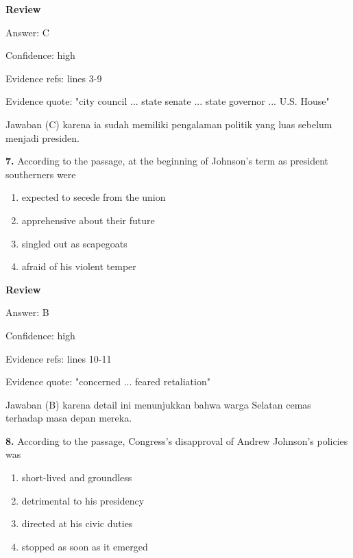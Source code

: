 \documentclass[12pt]{article}
\begin{document}
\par
\begingroup
\setlength{\parskip}{0pt}
\setlength{\parindent}{0pt}
\textbf{Review}\par
Answer: C\par
Confidence: high\par
Evidence refs: lines 3-9\par
Evidence quote: "city council ... state senate ... state governor ... U.S. House"\par
Jawaban (C) karena ia sudah memiliki pengalaman politik yang luas sebelum menjadi presiden.\par
\endgroup
\par
\vspace{0.25\baselineskip}
\noindent\textbf{7.} According to the passage, at the beginning of Johnson's term as president southerners were
\begin{enumerate}[label=(\Alph*),leftmargin=*,itemsep=0.2em]
\item expected to secede from the union
\item apprehensive about their future
\item singled out as scapegoats
\item afraid of his violent temper
\end{enumerate}
\par
\begingroup
\setlength{\parskip}{0pt}
\setlength{\parindent}{0pt}
\textbf{Review}\par
Answer: B\par
Confidence: high\par
Evidence refs: lines 10-11\par
Evidence quote: "concerned ... feared retaliation"\par
Jawaban (B) karena detail ini menunjukkan bahwa warga Selatan cemas terhadap masa depan mereka.\par
\endgroup
\par
\vspace{0.25\baselineskip}
\noindent\textbf{8.} According to the passage, Congress's disapproval of Andrew Johnson's policies was
\begin{enumerate}[label=(\Alph*),leftmargin=*,itemsep=0.2em]
\item short-lived and groundless
\item detrimental to his presidency
\item directed at his civic duties
\item stopped as soon as it emerged
\end{enumerate}
\par
\end{document}
